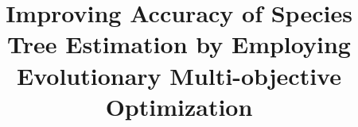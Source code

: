 \documentclass[runningheads]{llncs}
\begin{document}
%
\title{Improving Accuracy of Species Tree Estimation by Employing Evolutionary Multi-objective Optimization}
\author{}
\institute{}
%
\maketitle              %
%

 
 







%
%
%



%
\end{document}

